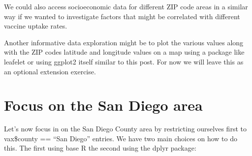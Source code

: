 \documentclass[
]{article}
\newenvironment{Shaded}{\begin{snugshade}}{\end{snugshade}}
\newcommand{\CommentTok}[1]{\textcolor[rgb]{0.56,0.35,0.01}{\textit{#1}}}
\newcommand{\FunctionTok}[1]{\textcolor[rgb]{0.00,0.00,0.00}{#1}}
\newcommand{\NormalTok}[1]{#1}
\newcommand{\OtherTok}[1]{\textcolor[rgb]{0.56,0.35,0.01}{#1}}
\newcommand{\SpecialCharTok}[1]{\textcolor[rgb]{0.00,0.00,0.00}{#1}}
\newcommand{\StringTok}[1]{\textcolor[rgb]{0.31,0.60,0.02}{#1}}
\begin{document}
We could also access socioeconomic data for different ZIP code areas in
a similar way if we wanted to investigate factors that might be
correlated with different vaccine uptake rates.

Another informative data exploration might be to plot the various values
along with the ZIP codes latitude and longitude values on a map using a
package like leafelet or using ggplot2 itself similar to this post. For
now we will leave this as an optional extension exercise.

\hypertarget{focus-on-the-san-diego-area}{%
\section{Focus on the San Diego
area}\label{focus-on-the-san-diego-area}}

Let's now focus in on the San Diego County area by restricting ourselves
first to vax\$county == ``San Diego'' entries. We have two main choices
on how to do this. The first using base R the second using the dplyr
package:

\begin{Shaded}
\end{Shaded}
\end{document}
